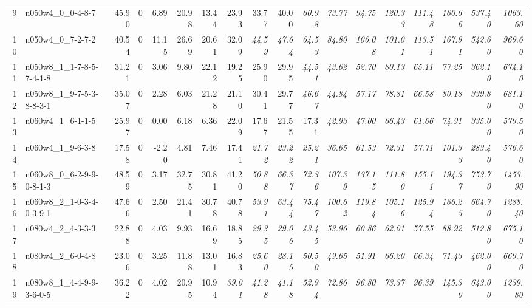 \documentclass[cic,tc, twoside]{iiufrgs}
\begin{document}
\begin{landscape}
\begin{table}[ht!]
{\begin{tabular}{rlrrrrrrrrrrrrrrrr}
    9 & n050w4\_0\_0-4-8-7 & 45.90 &   0 & 6.89 & 20.98 & 13.44 & 23.93 & 33.77 & 40.00 & \it 60.98 & \it 73.77 & \it 94.75 & \it 120.33 & \it 111.48 & \it 160.66 & \it 537.40 & \it 1063.60 \\
   10 & n050w4\_0\_7-2-7-2 & 40.54 &   0 & 11.15 & 26.69 & 20.61 & 32.09 & \it 44.59 & \it 47.64 & \it 64.53 & \it 84.80 & \it 106.08 & \it 101.01 & \it 113.51 & \it 167.91 & \it 542.60 & \it 969.60 \\
   11 & n050w8\_1\_1-7-8-5-7-4-1-8 & 31.21 &   0 & 3.06 & 9.80 & 22.12 & 19.25 & 25.90 & 29.95 & \it 44.51 & \it 43.62 & \it 52.70 & \it 80.13 & \it 65.11 & \it 77.25 & \it 362.10 & \it 674.10 \\
   12 & n050w8\_1\_9-7-5-3-8-8-3-1 & 35.07 &   0 & 2.28 & 6.03 & 21.28 & 21.10 & 30.41 & 29.77 & \it 46.67 & \it 44.84 & \it 57.17 & \it 78.81 & \it 66.58 & \it 80.18 & \it 339.80 & \it 681.10 \\
   13 & n060w4\_1\_6-1-1-5 & 25.97 &   0 & 0.00 & 6.18 & 6.36 & 22.09 & 17.67 & 21.55 & 17.31 & \it 42.93 & \it 47.00 & \it 66.43 & \it 61.66 & \it 74.91 & \it 335.00 & \it 579.50 \\
   14 & n060w4\_1\_9-6-3-8 & 17.58 &   0 & -2.20 & 4.81 & 7.46 & 17.41 & \it 21.72 & \it 23.22 & \it 25.21 & \it 36.65 & \it 61.53 & \it 72.31 & \it 57.71 & \it 101.33 & \it 283.40 & \it 576.60 \\
   15 & n060w8\_0\_6-2-9-9-0-8-1-3 & 48.59 &   0 & 3.17 & 32.75 & 30.81 & 41.20 & \it 50.88 & \it 66.37 & \it 72.36 & \it 107.39 & \it 137.15 & \it 111.80 & \it 155.11 & \it 194.37 & \it 753.70 & \it 1453.90 \\
   16 & n060w8\_2\_1-0-3-4-0-3-9-1 & 47.66 &   0 & 2.50 & 21.41 & 30.78 & 40.78 & \it 53.91 & \it 63.44 & \it 75.47 & \it 100.62 & \it 119.84 & \it 105.16 & \it 125.94 & \it 166.25 & \it 664.70 & \it 1288.40 \\
   17 & n080w4\_2\_4-3-3-3 & 22.88 &   0 & 4.03 & 9.93 & 16.69 & 18.85 & \it 29.35 & \it 29.06 & \it 43.45 & \it 53.96 & \it 60.86 & \it 62.01 & \it 57.55 & \it 88.92 & \it 512.80 & \it 675.10 \\
   18 & n080w4\_2\_6-0-4-8 & 23.06 &   0 & 3.25 & 11.88 & 13.01 & 16.83 & \it 25.60 & \it 28.15 & \it 50.50 & \it 49.65 & \it 51.91 & \it 66.20 & \it 66.34 & \it 71.43 & \it 462.00 & \it 669.70 \\
   19 & n080w8\_1\_4-4-9-9-3-6-0-5 & 36.22 &   0 & 4.02 & 20.95 & 10.94 & \it 39.01 & \it 41.28 & \it 41.18 & \it 52.94 & \it 72.86 & \it 96.80 & \it 73.37 & \it 96.39 & \it 145.30 & \it 643.00 & \it 1239.80 \\

\end{tabular}}
\end{table}
\end{landscape}
\end{document}
